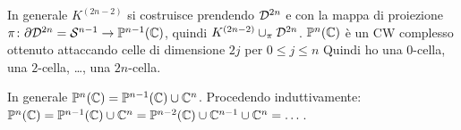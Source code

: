 
In generale $ K^{(2n - 2)} $ si costruisce prendendo $ \mathcal{D}^{2n} $ e con la mappa
di proiezione $ \pi \colon \partial \mathcal{D}^{2n} = \mathcal{S}^{n-1} \to \mathbb{P}^{n-1} (\mathbb{C}) $, quindi $ K^{(2n -2)} \cup_\pi \mathcal{D}^{2n} $.
$ \mathbb{P}^{n} (\mathbb{C}) $ è un CW complesso ottenuto attaccando celle di dimensione $ 2j $ per $ 0 \leq j \leq n $
Quindi ho una $ 0 $-cella, una $ 2 $-cella, \dots, una $ 2n $-cella.

\begin{osservation}
  In generale $ \mathbb{P}^{n} (\mathbb{C}) = \mathbb{P}^{n-1} (\mathbb{C}) \cup \mathbb{C}^n $. Procedendo induttivamente:
  $ \mathbb{P}^{n} (\mathbb{C}) = \mathbb{P}^{n-1} (\mathbb{C}) \cup \mathbb{C}^n = \mathbb{P}^{n-2} (\mathbb{C}) \cup \mathbb{C}^{n-1} \cup \mathbb{C}^{n} = \dots $.
\end{osservation}


